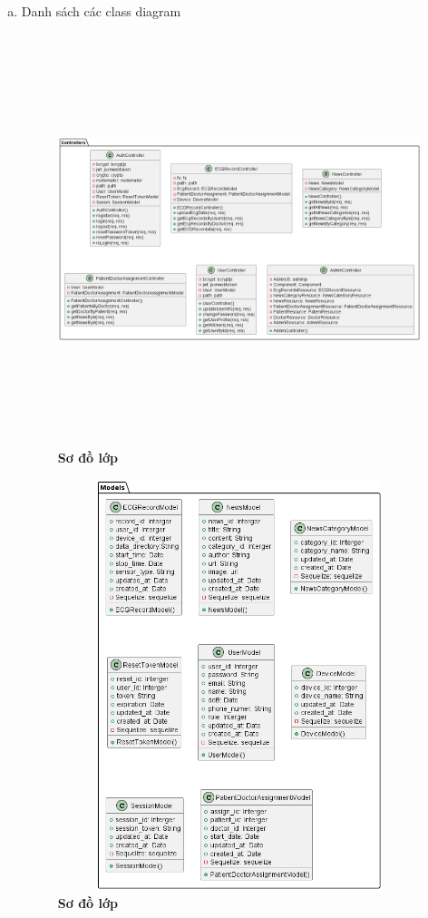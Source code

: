 \begin{enumerate}[a)]
\item Danh sách các class diagram

\begin{figure}[H]
  \centering
  \includegraphics[width=15cm,height=12cm]{Images/server/class/class_controller.png}
  \caption[Sơ đồ lớp]{\bfseries \fontsize{12pt}{0pt}\selectfont Sơ đồ lớp}
  \label{hinh2} %
\end{figure}



\begin{figure}[H]
  \centering
  \includegraphics[width=15cm,height=12cm]{Images/server/class/class_model.png}
  \caption[Sơ đồ lớp]{\bfseries \fontsize{12pt}{0pt}\selectfont Sơ đồ lớp}
  \label{hinh2} %
\end{figure}



\end{enumerate}
